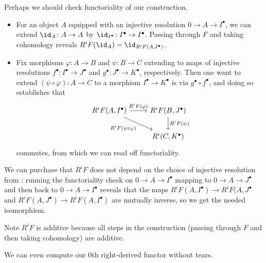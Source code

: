 \documentclass[../notes.tex]{subfiles}
\begin{document}
\begin{remark} \label{rem:rd-almost-well-def}
	Perhaps we should check functoriality of our construction.
	\begin{itemize}
		\item For an object $A$ equipped with an injective resolution $0\to A\to I^\bullet$, we can extend $\id_A\colon A\to A$ by $\id_{I^\bullet}\colon I^\bullet\to I^\bullet$. Passing through $F$ and taking cohomology reveals $R^iF({\id_A})=\id_{R^iF(A,I^\bullet)}$.
		\item Fix morphisms $\varphi\colon A\to B$ and $\psi\colon B\to C$ extending to maps of injective resolutions $f^\bullet\colon I^\bullet\to J^\bullet$ and $g^\bullet\colon J^\bullet\to K^\bullet$, respectively. Then one want to extend $(\psi\circ\varphi)\colon A\to C$ to a morphism $I^\bullet\to K^\bullet$ is via $g^\bullet\circ f^\bullet$, and doing so establishes that
		\[\begin{tikzcd}
			{R^iF(A,I^\bullet)} & {R^iF(B,J^\bullet)} \\
			& {R^i(C,K^\bullet)}
			\arrow["{R^iF(\varphi)}", from=1-1, to=1-2]
			\arrow["{R^iF(\psi)}", from=1-2, to=2-2]
			\arrow["{R^iF(\psi\circ\varphi)}"', from=1-1, to=2-2]
		\end{tikzcd}\]
		commutes, from which we can read off functoriality.
	\end{itemize}
\end{remark}
\begin{remark}
	We can purchase that $R^iF$ does not depend on the choice of injective resolution from : running the functoriality check on $0\to A\to I^\bullet$ mapping to $0\to A\to J^\bullet$ and then back to $0\to A\to I^\bullet$ reveals that the maps $R^iF(A,I^\bullet)\to R^iF(A,J^\bullet$ and $R^iF(A,J^\bullet)\to R^iF(A,I^\bullet)$ are mutually inverse, so we get the needed isomorphism.
\end{remark}
\begin{remark}
	Note $R^iF$ is additive because all steps in the construction (passing through $F$ and then taking cohomology) are additive.
\end{remark}
We can even compute our $0$th right-derived functor without tears.
\end{document}
